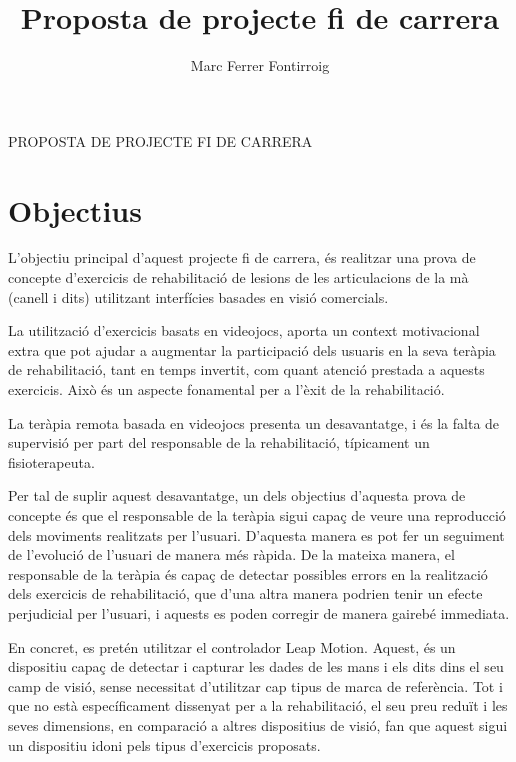 \documentclass[12pt,a4paper]{article}
\author{Marc Ferrer Fontirroig}
\title{Proposta de projecte fi de carrera}
\begin{document}
	\begin{center}
		\huge PROPOSTA DE PROJECTE FI DE CARRERA
	\end{center}
	\section*{Objectius}
	\thispagestyle{empty}
	L'objectiu principal d'aquest projecte fi de carrera, és realitzar una prova de concepte d'exercicis de rehabilitació de lesions de les articulacions de la mà (canell i dits) utilitzant interfícies basades en visió comercials.
	
	La utilització d'exercicis basats en videojocs, aporta un context motivacional extra que pot ajudar a augmentar la participació dels usuaris en la seva teràpia de rehabilitació, tant en temps invertit, com quant atenció prestada a aquests exercicis. Això és un aspecte fonamental per a l'èxit de la rehabilitació.
	
	La teràpia remota basada en videojocs presenta un desavantatge, i és la falta de supervisió per part del responsable de la rehabilitació, típicament un fisioterapeuta.
	
	Per tal de suplir aquest desavantatge, un dels objectius d'aquesta prova de concepte és que el responsable de la teràpia sigui capaç de veure una reproducció dels moviments realitzats per l'usuari. D'aquesta manera es pot fer un seguiment de l'evolució de l'usuari de manera més ràpida. De la mateixa manera, el responsable de la teràpia és capaç de detectar possibles errors en la realització dels exercicis de rehabilitació, que d'una altra manera podrien tenir un efecte perjudicial per l'usuari, i aquests es poden corregir de manera gairebé immediata.
	
	En concret, es pretén utilitzar el controlador Leap Motion. Aquest, és un dispositiu capaç de detectar i capturar les dades de les mans i els dits dins el seu camp de visió, sense necessitat d'utilitzar cap tipus de marca de referència. Tot i que no està específicament dissenyat per a la rehabilitació, el seu preu reduït i les seves dimensions, en comparació a altres dispositius de visió, fan que aquest sigui un dispositiu idoni pels tipus d'exercicis proposats.
\end{document}
